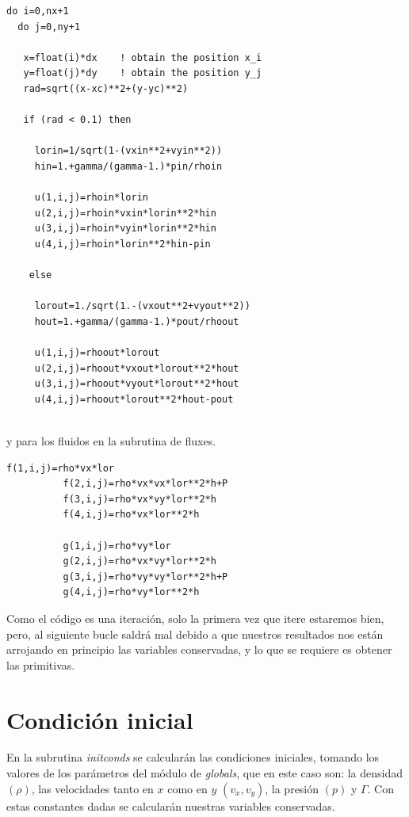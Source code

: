 \documentclass[12pt,a4paper]{book}
\begin{document}
\begin{lstlisting}[frame=single] 
do i=0,nx+1
  do j=0,ny+1
   
   x=float(i)*dx 	! obtain the position x_i
   y=float(j)*dy 	! obtain the position y_j
   rad=sqrt((x-xc)**2+(y-yc)**2)
   
   if (rad < 0.1) then
   
     lorin=1/sqrt(1-(vxin**2+vyin**2))
     hin=1.+gamma/(gamma-1.)*pin/rhoin
           
     u(1,i,j)=rhoin*lorin
     u(2,i,j)=rhoin*vxin*lorin**2*hin
     u(3,i,j)=rhoin*vyin*lorin**2*hin
     u(4,i,j)=rhoin*lorin**2*hin-pin
    
    else
    
     lorout=1./sqrt(1.-(vxout**2+vyout**2))
     hout=1.+gamma/(gamma-1.)*pout/rhoout
     
     u(1,i,j)=rhoout*lorout
     u(2,i,j)=rhoout*vxout*lorout**2*hout
     u(3,i,j)=rhoout*vyout*lorout**2*hout
     u(4,i,j)=rhoout*lorout**2*hout-pout
     
\end{lstlisting}
y para los fluidos en la subrutina de fluxes.
\begin{lstlisting}[frame=single]
          f(1,i,j)=rho*vx*lor
          f(2,i,j)=rho*vx*vx*lor**2*h+P
          f(3,i,j)=rho*vx*vy*lor**2*h
          f(4,i,j)=rho*vx*lor**2*h

          g(1,i,j)=rho*vy*lor
          g(2,i,j)=rho*vx*vy*lor**2*h
          g(3,i,j)=rho*vy*vy*lor**2*h+P
          g(4,i,j)=rho*vy*lor**2*h
\end{lstlisting}
Como el código es una iteración, solo la primera vez que itere estaremos bien, pero, al siguiente bucle saldrá mal debido a que nuestros resultados nos están arrojando en principio las variables conservadas, y lo que 
se requiere es obtener las primitivas.

\section{Condición inicial}
En la subrutina \textit{initconds} se calcularán las condiciones iniciales, tomando los valores de los parámetros del módulo de \textit{globals}, que en este caso son: la densidad $(\rho)$, las velocidades tanto en $x$ 
como en $y$ $(v_x, v_y)$, la presión $(p)$ y $\Gamma$. Con estas constantes dadas se calcularán nuestras variables conservadas.
\end{document}
